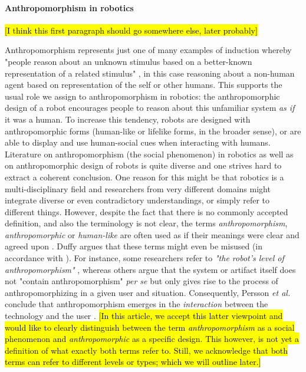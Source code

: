 \documentclass{frontiersSCNS} %
\begin{document}
\paragraph{Anthropomorphism in robotics}
\hl{[I think this first paragraph should go somewhere else, later probably]}

Anthropomorphism represents just one of many examples of induction whereby
"people reason about an unknown stimulus based on a better-known representation
of a related stimulus" \cite{epley_when_2008}, in this case reasoning about a
non-human agent based on representation of the self or other humans. This
supports the usual role we assign to anthropomorphism in robotics: the
anthropomorphic design of a robot encourages people to reason about this
unfamiliar system \emph{as if} it was a human. To increase this tendency, robots
are designed with anthropomorphic forms (human-like or lifelike forms, in the
broader sense), or are able to display and use human-social cues when
interacting with humans.\\

Literature on anthropomorphism (the social phenomenon) in robotics as well as on
anthropomorphic design of robots is quite diverse and one strives hard to
extract a coherent conclusion. One reason for this might be that robotics is a
multi-disciplinary field and researchers from very different domains might
integrate diverse or even contradictory understandings, or simply refer to
different things. However, despite the fact that there is no commonly accepted
definition, and also the terminology is not clear, the terms
\textit{anthropomorphism}, \textit{anthropomorphic} or \textit{human-like} are
often used as if their meanings were clear and agreed upon
\cite{persson_anthropomorphism_2000}. Duffy \cite{duffy_anthropomorphism_2002}
argues that these terms might even be misused (in accordance with
\cite{epley_when_2008}). For instance, some researchers refer to \textit{"the
robot's level of anthropomorphism"} \cite{bartneck_is_2007}, whereas others
argue that the system or artifact itself does not "contain anthropomorphism"
\textit{per se} but only gives rise to the process of anthropomorphizing in a
given user and situation. Consequently, Persson \textit{et al.} conclude that
anthropomorphism emerges in the \textit{interaction} between the technology and
the user \cite{persson_anthropomorphism_2000}.  \hl{[In this article, we accept
this latter viewpoint and would like to clearly distinguish between the term
\textit{anthropomorphism} as a social phenomenon and \textit{anthropomorphic} as
a specific design. This however, is not yet a definition of what exactly both
terms refer to. Still, we acknowledge that both terms can refer to different
levels or types; which we will outline later.]} 
\end{document}
